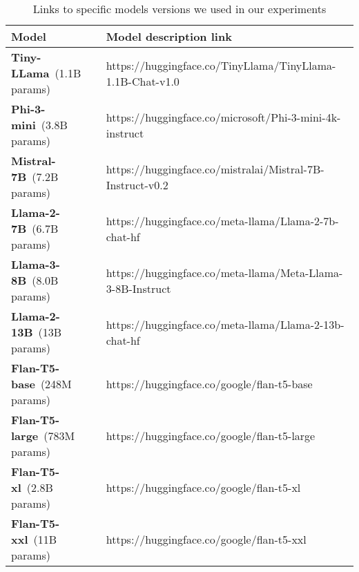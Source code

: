 \begin{table*}[!ht]
    \centering
    \footnotesize
    \begin{tabular}{l|p{110mm}}
    \toprule
    Model & Model description link\\
    \midrule
             
        \textbf{Tiny-LLama}~(1.1B params) & https://huggingface.co/TinyLlama/TinyLlama-1.1B-Chat-v1.0\\
        \textbf{Phi-3-mini}~(3.8B params) & https://huggingface.co/microsoft/Phi-3-mini-4k-instruct \\
        \textbf{Mistral-7B}~(7.2B params) & https://huggingface.co/mistralai/Mistral-7B-Instruct-v0.2 \\
        \textbf{Llama-2-7B}~(6.7B params) & https://huggingface.co/meta-llama/Llama-2-7b-chat-hf \\
        \textbf{Llama-3-8B}~(8.0B params) & https://huggingface.co/meta-llama/Meta-Llama-3-8B-Instruct \\
        \textbf{Llama-2-13B}~(13B params) & https://huggingface.co/meta-llama/Llama-2-13b-chat-hf \\ 

        \midrule
        
        \textbf{Flan-T5-base}~(248M params) & https://huggingface.co/google/flan-t5-base \\
        \textbf{Flan-T5-large}~(783M params)& https://huggingface.co/google/flan-t5-large \\
        \textbf{Flan-T5-xl}~(2.8B params)   & https://huggingface.co/google/flan-t5-xl \\
        \textbf{Flan-T5-xxl}~(11B params)   & https://huggingface.co/google/flan-t5-xxl\\
    
    \bottomrule
    \end{tabular}
    \caption{Links to specific models versions we used in our experiments}
    \label{tab:models-app}
\end{table*}
